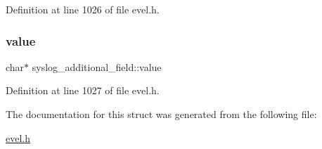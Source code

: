 Definition at line 1026 of file evel.\+h.

\hypertarget{structsyslog__additional__field_a82ae1cdc9dc4b8100f55581f7efe6229}{}\label{structsyslog__additional__field_a82ae1cdc9dc4b8100f55581f7efe6229} 
\subsubsection{\texorpdfstring{value}{value}}
{\footnotesize\ttfamily char$\ast$ syslog\+\_\+additional\+\_\+field\+::value}



Definition at line 1027 of file evel.\+h.



The documentation for this struct was generated from the following file\+:\begin{DoxyCompactItemize}
\item 
\hyperlink{evel_8h}{evel.\+h}\end{DoxyCompactItemize}
